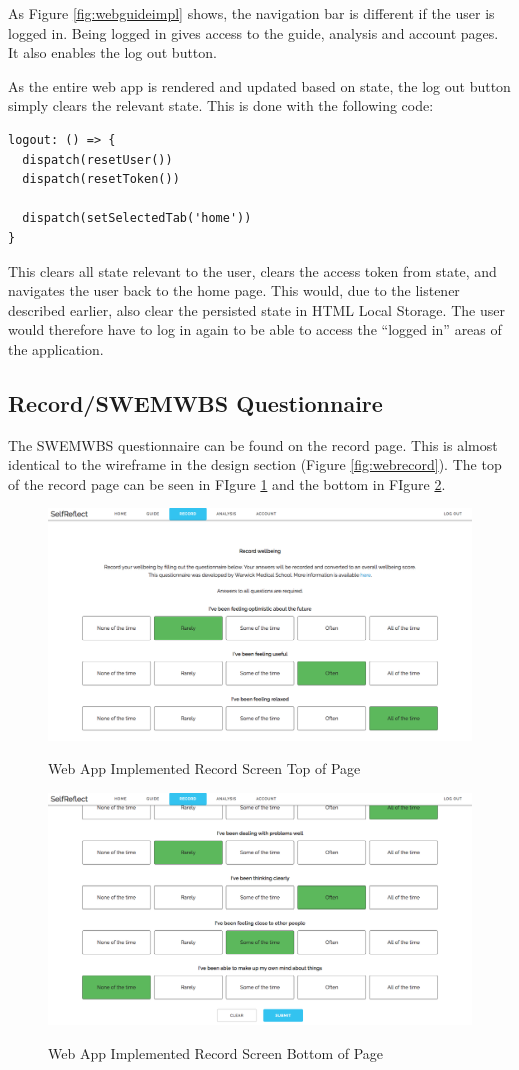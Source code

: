 \documentclass[11pt,openright,a4paper]{report}
\begin{document}
As Figure \ref{fig:webguideimpl} shows, the navigation bar is different if the user is logged in. Being logged in gives access to the guide, analysis and account pages. It also enables the log out button.

As the entire web app is rendered and updated based on state, the log out button simply clears the relevant state. This is done with the following code:
\begin{lstlisting}
logout: () => {
  dispatch(resetUser())
  dispatch(resetToken())

  dispatch(setSelectedTab('home'))
}
\end{lstlisting}

This clears all state relevant to the user, clears the access token from state, and navigates the user back to the home page. This would, due to the listener described earlier, also clear the persisted state in HTML Local Storage. The user would therefore have to log in again to be able to access the \enquote{logged in} areas of the application.

\subsection{Record/SWEMWBS Questionnaire}
The SWEMWBS questionnaire can be found on the record page. This is almost identical to the wireframe in the design section (Figure \ref{fig:webrecord}). The top of the record page can be seen in FIgure \ref{fig:webrecordimpltop} and the bottom in FIgure \ref{fig:webrecordimplbottom}.

\begin{figure}[ht]
\centering
\caption{Web App Implemented Record Screen Top of Page}
\includegraphics[width=.75\textwidth]{i/webrecordimpltop.png}
\label{fig:webrecordimpltop}
\end{figure}

\begin{figure}[ht]
\centering
\caption{Web App Implemented Record Screen Bottom of Page}
\includegraphics[width=.75\textwidth]{i/webrecordimplbottom.png}
\label{fig:webrecordimplbottom}
\end{figure}
\end{document}
